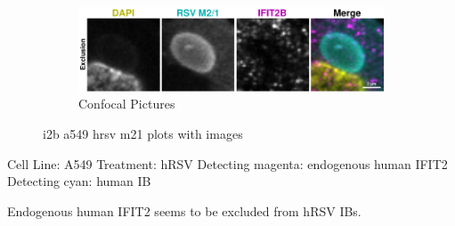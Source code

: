 \begin{figure}
    \begin{subfigure}{1\textwidth}
        \includegraphics[width=1\linewidth]{10. Chapter 5/Figs/01. Infection/02. IFIT2B/09. i2b a549 hrsv m21.pdf} 
        \caption[]{Confocal Pictures}
    \end{subfigure}
    \caption[i2b a549 hrsv m21 plots with images]{i2b a549 hrsv m21 plots with images}
    \label{fig:i2b a549 hrsv m21 plots with images}
\end{figure}

Cell Line: A549 \newline
Treatment: hRSV \newline
Detecting magenta: endogenous human IFIT2  \newline
Detecting cyan: human IB \newline

Endogenous human IFIT2 seems to be excluded from hRSV IBs.

